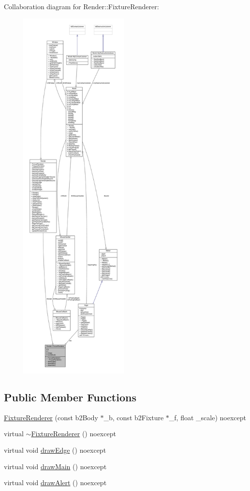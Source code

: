 Collaboration diagram for Render\+:\+:Fixture\+Renderer\+:
\nopagebreak
\begin{figure}[H]
\begin{center}
\leavevmode
\includegraphics[height=550pt]{classRender_1_1FixtureRenderer__coll__graph}
\end{center}
\end{figure}
\subsection*{Public Member Functions}
\begin{DoxyCompactItemize}
\item 
\hyperlink{classRender_1_1FixtureRenderer_a5c2a71f6f1eabce19700ce57fb5a0c3b}{Fixture\+Renderer} (const b2\+Body $\ast$\+\_\+b, const b2\+Fixture $\ast$\+\_\+f, float \+\_\+scale) noexcept
\item 
virtual \hyperlink{classRender_1_1FixtureRenderer_a9c9dcfaa311b55a2e6f88eaa71c0f700}{$\sim$\+Fixture\+Renderer} () noexcept
\item 
virtual void \hyperlink{classRender_1_1FixtureRenderer_af0b5bfc5af5a2bb4a80eb7afc7e1398f}{draw\+Edge} () noexcept
\item 
virtual void \hyperlink{classRender_1_1FixtureRenderer_a20f23477aa8cc646f2d18b0165666e3b}{draw\+Main} () noexcept
\item 
virtual void \hyperlink{classRender_1_1FixtureRenderer_a3208fef7547ef2f61d68ddfd3ceb05da}{draw\+Alert} () noexcept
\end{DoxyCompactItemize}
